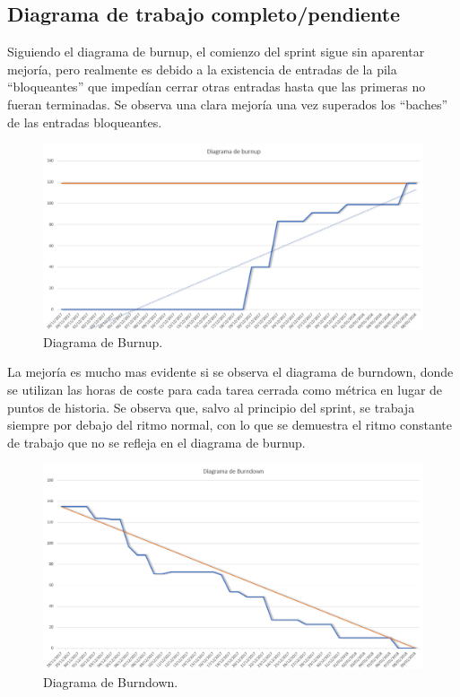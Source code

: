 \documentclass[11pt,a4paper]{report}
\begin{document}
\subsection{Diagrama de trabajo completo/pendiente}
Siguiendo el diagrama de burnup, el comienzo del sprint sigue sin aparentar mejoría, pero realmente es debido a la existencia de entradas de la pila “bloqueantes” que impedían cerrar otras entradas hasta que las primeras no fueran terminadas. Se observa una clara mejoría una vez superados los “baches” de las entradas bloqueantes.
\begin{figure}[H]
	
	\centering
	
	\includegraphics[width=1\textwidth]{graficos/burnup.png}
	
	\caption{Diagrama de Burnup.}
	
	\label{fig: burnup2}
	
\end{figure}
La mejoría es mucho mas evidente si se observa el diagrama de burndown, donde se utilizan las horas de coste para cada tarea cerrada como métrica en lugar de puntos de historia. Se observa que, salvo al principio del sprint, se trabaja siempre por debajo del ritmo normal, con lo que se demuestra el ritmo constante de trabajo que no se refleja en el diagrama de burnup.
\begin{figure}[H]
	\centering
	\includegraphics[width=1\textwidth]{graficos/burndown.png}
	\caption{Diagrama de Burndown.}
	\label{fig: burndown2}
\end{figure}
\end{document}
